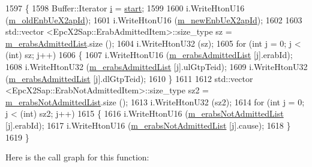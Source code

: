 \begin{DoxyCode}
1597 \{
1598   Buffer::Iterator \hyperlink{bernuolliDistribution_8m_a6f6ccfcf58b31cb6412107d9d5281426}{i} = \hyperlink{namespacevisualizer_1_1core_a2a35e5d8a34af358b508dac8635754e0}{start};
1599 
1600   i.WriteHtonU16 (\hyperlink{classns3_1_1EpcX2HandoverRequestAckHeader_a5a92dccc1ba92cab6e24c3ee08c3f418}{m\_oldEnbUeX2apId});
1601   i.WriteHtonU16 (\hyperlink{classns3_1_1EpcX2HandoverRequestAckHeader_a6a743b8acf6351e7a8a63d361888793a}{m\_newEnbUeX2apId});
1602 
1603   std::vector <EpcX2Sap::ErabAdmittedItem>::size\_type sz = \hyperlink{classns3_1_1EpcX2HandoverRequestAckHeader_aae103cf49fa679625cf673810ecb29e6}{m\_erabsAdmittedList}.size (); 
1604   i.WriteHtonU32 (sz);
1605   \textcolor{keywordflow}{for} (\textcolor{keywordtype}{int} j = 0; j < (int) sz; j++)
1606     \{
1607       i.WriteHtonU16 (\hyperlink{classns3_1_1EpcX2HandoverRequestAckHeader_aae103cf49fa679625cf673810ecb29e6}{m\_erabsAdmittedList} [j].erabId);
1608       i.WriteHtonU32 (\hyperlink{classns3_1_1EpcX2HandoverRequestAckHeader_aae103cf49fa679625cf673810ecb29e6}{m\_erabsAdmittedList} [j].ulGtpTeid);
1609       i.WriteHtonU32 (\hyperlink{classns3_1_1EpcX2HandoverRequestAckHeader_aae103cf49fa679625cf673810ecb29e6}{m\_erabsAdmittedList} [j].dlGtpTeid);
1610     \}
1611 
1612   std::vector <EpcX2Sap::ErabNotAdmittedItem>::size\_type sz2 = 
      \hyperlink{classns3_1_1EpcX2HandoverRequestAckHeader_abe32eccfe9ba3a6abde04f72bfb32b8b}{m\_erabsNotAdmittedList}.size (); 
1613   i.WriteHtonU32 (sz2);
1614   \textcolor{keywordflow}{for} (\textcolor{keywordtype}{int} j = 0; j < (int) sz2; j++)
1615     \{
1616       i.WriteHtonU16 (\hyperlink{classns3_1_1EpcX2HandoverRequestAckHeader_abe32eccfe9ba3a6abde04f72bfb32b8b}{m\_erabsNotAdmittedList} [j].erabId);
1617       i.WriteHtonU16 (\hyperlink{classns3_1_1EpcX2HandoverRequestAckHeader_abe32eccfe9ba3a6abde04f72bfb32b8b}{m\_erabsNotAdmittedList} [j].cause);
1618     \}
1619 \}
\end{DoxyCode}


Here is the call graph for this function\+:


